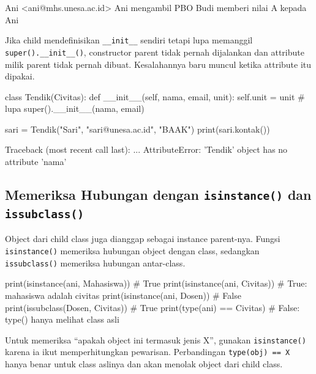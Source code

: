 \begin{keluaran}
Ani <ani@mhs.unesa.ac.id>
Ani mengambil PBO
Budi memberi nilai A kepada Ani
\end{keluaran}

\begin{penting}
Jika child mendefinisikan \texttt{\_\_init\_\_} sendiri tetapi lupa memanggil \texttt{super().\_\_init\_\_()}, constructor parent tidak pernah dijalankan dan attribute milik parent tidak pernah dibuat. Kesalahannya baru muncul ketika attribute itu dipakai.
\end{penting}

\begin{kode}
class Tendik(Civitas):
    def __init__(self, nama, email, unit):
        self.unit = unit                 # lupa super().__init__(nama, email)

sari = Tendik("Sari", "sari@unesa.ac.id", "BAAK")
print(sari.kontak())
\end{kode}

\begin{keluaran}
Traceback (most recent call last):
  ...
AttributeError: 'Tendik' object has no attribute 'nama'
\end{keluaran}

\subsection{Memeriksa Hubungan dengan \texttt{isinstance()} dan \texttt{issubclass()}}

Object dari child class juga dianggap sebagai instance parent-nya. Fungsi \texttt{isinstance()} memeriksa hubungan object dengan class, sedangkan \texttt{issubclass()} memeriksa hubungan antar-class.

\begin{kode}
print(isinstance(ani, Mahasiswa))     # True
print(isinstance(ani, Civitas))       # True: mahasiswa adalah civitas
print(isinstance(ani, Dosen))         # False
print(issubclass(Dosen, Civitas))     # True
print(type(ani) == Civitas)           # False: type() hanya melihat class asli
\end{kode}

\begin{tips}
Untuk memeriksa ``apakah object ini termasuk jenis X'', gunakan \texttt{isinstance()} karena ia ikut memperhitungkan pewarisan. Perbandingan \texttt{type(obj) == X} hanya benar untuk class aslinya dan akan menolak object dari child class.
\end{tips}

